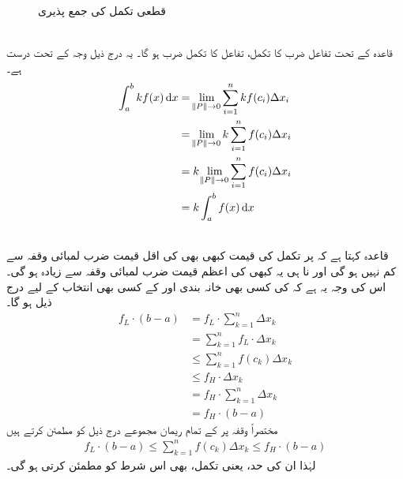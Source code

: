 \begin{figure}
\centering
{}
\caption{قطعی تکمل کی جمع پذیری}
\label{شکل_تکمل_جمع_پذیری}
\end{figure}
 \\
قاعدہ  کے تحت تفاعل ضرب  کا تکمل، تفاعل کا تکمل ضرب  ہو گا۔ یہ درج ذیل وجہ کے تحت  درست ہے۔
\begin{align*}
\int_a^bkf(x)\dif x&=\lim_{\norm{P}\to0}\sum\limits_{i=1}^n kf(c_i)\Delta x_i\\
&=\lim_{\norm{P}\to 0}k\sum\limits_{i=1}^nf(c_i)\Delta x_i\\
&=k\lim_{\norm{P}\to 0}\sum\limits_{i=1}^n f(c_i)\Delta x_i\\
&=k\int_a^bf(x)\dif x
\end{align*}

\\
قاعدہ  کہتا ہے کہ  پر تکمل کی قیمت کبھی بھی  کی  اقل قیمت ضرب لمبائی وقفہ سے کم نہیں ہو گی اور نا ہی یہ کبھی  کی  اعظم قیمت ضرب لمبائی وقفہ سے زیادہ ہو گی۔ اس کی وجہ یہ ہے کہ  کی کسی بھی خانہ بندی اور  کے کسی بھی انتخاب کے لیے درج ذیل ہو گا۔
\begin{align*}
f_L\cdot(b-a)&=f_L\cdot\sum\limits_{k=1}^n \Delta x_k\\
&=\sum\limits_{k=1}^n f_L\cdot \Delta x_k\\
&\le \sum\limits_{k=1}^n f(c_k)\Delta x_k\\
&\le f_H\cdot \Delta x_k\\
&=f_H\cdot \sum\limits_{k=1}^n \Delta x_k\\
&=f_H\cdot (b-a)
\end{align*}
مختصراً وقفہ  پر  کے تمام ریمان مجموعے درج ذیل کو مطمئن کرتے ہیں
\begin{align*}
f_L\cdot (b-a)\le \sum\limits_{k=1}^n f(c_k)\Delta x_k\le f_H\cdot(b-a)
\end{align*}
لہٰذا ان کی حد، یعنی تکمل، بھی اس شرط کو مطمئن کرتی  ہو گی۔

